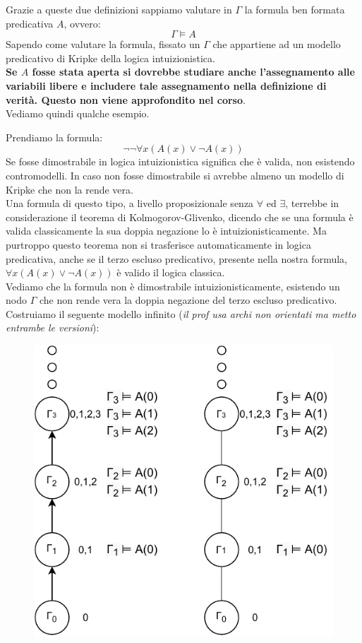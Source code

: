 \documentclass[a4paper,12pt, oneside]{book}
\begin{document}
Grazie a queste due definizioni sappiamo valutare in $\Gamma$ la formula ben
formata predicativa $A$, ovvero:
\[\Gamma\vDash A\]
Sapendo come valutare la formula, fissato un $\Gamma$ che appartiene ad un
modello predicativo di Kripke della logica intuizionistica.\\
\textbf{Se $A$ fosse stata aperta si dovrebbe studiare anche l'assegnamento alle
  variabili libere e includere tale assegnamento nella definizione di
  verità. Questo non viene approfondito nel corso}.\\
Vediamo quindi qualche esempio.
\begin{esempio}
  Prendiamo la formula:
  \[\neg\neg\forall x(A(x)\lor \neg A(x))\]
  Se fosse dimostrabile in logica intuizionistica significa che è valida, non
  esistendo contromodelli. In caso non fosse dimostrabile si avrebbe almeno un
  modello di Kripke che non la rende vera.\\
  Una formula di questo tipo, a livello proposizionale senza $\forall$ ed
  $\exists$, terrebbe in considerazione il teorema
  di Kolmogorov-Glivenko, dicendo che se una formula è valida classicamente la
  sua doppia negazione lo è intuizionisticamente. Ma purtroppo questo teorema
  non si trasferisce automaticamente in logica predicativa, anche se il terzo
  escluso predicativo, presente nella nostra formula, $\forall x(A(x)\lor \neg
  A(x))$ è valido il logica classica. \\
  Vediamo che la formula non è dimostrabile intuizionisticamente, esistendo un
  nodo $\Gamma$ che non rende vera la doppia negazione del terzo escluso
  predicativo. \\
  Costruiamo il seguente modello infinito (\textit{il prof usa archi non
    orientati ma metto entrambe le versioni}):
   \begin{figure}[H]
    \centering
    \includegraphics[scale = 0.9]{img/k5.pdf}

\end{figure}
\end{esempio}
\end{document}
